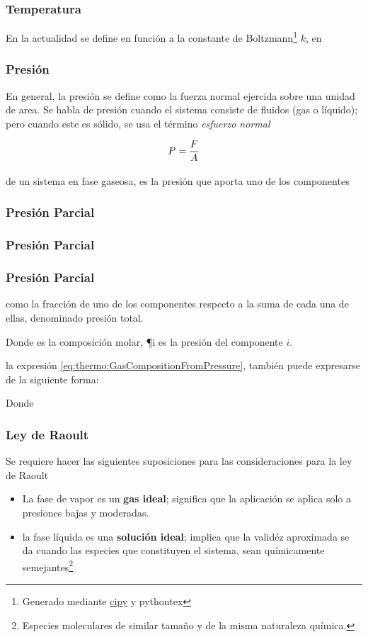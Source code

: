 \subsubsection{Temperatura}
En la actualidad se define en función a la constante de Boltzmann\footnote{Generado mediante \href{https://docs.scipy.org/doc/scipy/reference/constants.html}{cipy} y pythontex} {$k$},  en
\subsubsection{Presión}
En general, la presión se define como la fuerza normal ejercida sobre una unidad de area. Se habla de presión cuando el sistema consiste de fluidos (gas o líquido); pero cuando este es sólido, se usa el término \textit{esfuerzo normal} \textcite{YunusA.Cengel2015}

\begin{equation}
   P_{}^{} = \frac{{F}_{}^{}}{{A}_{}^{}} 
\end{equation}

\figMolecularColissions

de un sistema en fase gaseosa, es la presión que aporta uno de los componentes


\subsubsection{Presión Parcial}
\subsubsection{Presión Parcial}

\subsubsection{Presión Parcial}
como la fracción de uno de los componentes respecto a la suma de cada una de ellas, denominado presión total.

\eqGasCompositionFromPressure
Donde  es la composición molar, {\P{i}} es la presión del componente {${i}$}.

la expresión \eqref{eq:thermo:GasCompositionFromPressure}, también puede expresarse de la siguiente forma:

\eqGasCompositionFromTotalPressure
Donde

\subsubsection*{Ley de Raoult}
Se requiere hacer las siguientes suposiciones para las consideraciones para la ley de Raoult \parencite{Smith.VanNess.Abbott2007}
\begin{itemize}
  \item La fase de vapor es un \textbf{gas ideal}; significa que la aplicación se aplica solo a presiones bajas y moderadas.
  \item la fase líquida es una \textbf{solución ideal}; implica que la validéz aproximada se da cuando las especies que constituyen el sistema, sean químicamente semejantes\footnote{Especies moleculares de similar tamaño y de la misma naturaleza química.}
\end{itemize}

